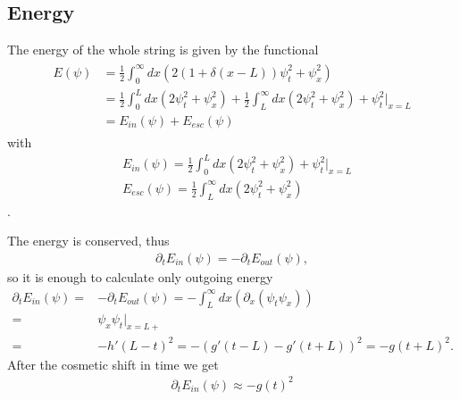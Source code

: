 \documentclass[
a4paper,%
10pt,%
titlepage,%
twoside%
]{article}
\begin{document}



\subsection{Energy}
The energy of the whole string is given by the functional
\begin{align}
  \begin{split}
    E(\psi)&=\frac{1}{2}\int_0^\infty dx (2(1+\delta(x-L))\psi_t^2+\psi_x^2)\\
    &=\frac{1}{2}\int_0^L dx(2\psi_t^2+\psi_x^2)+\frac{1}{2}\int_L^\infty dx(2\psi_t^2+\psi_x^2)+\psi_t^2\bigg|_{x=L}\\
    &=E_{in}(\psi)+E_{esc}(\psi)
  \end{split}
\end{align}
with
\begin{align}
  &E_{in}(\psi)=\frac{1}{2}\int_0^L dx(2\psi_t^2+\psi_x^2)+\psi_t^2\bigg|_{x=L}\\
  &E_{esc}(\psi)=\frac{1}{2}\int_L^\infty dx(2\psi_t^2+\psi_x^2)
\end{align}.

The energy is conserved, thus
\begin{align}
  \partial_t E_{in}(\psi)=-\partial_t E_{out}(\psi),
\end{align}
so it is enough to calculate only outgoing energy
\begin{align}\label{eq:enleak}
  \partial_t E_{in}(\psi)=&-\partial_t E_{out}(\psi)=-\int_L^\infty dx(\partial_x(\psi_t\psi_x))\\
  =&\psi_x\psi_t\big|_{x=L+}\\
  =&-h'(L-t)^2=-(g'(t-L)-g'(t+L))^2=-g(t+L)^2.
\end{align}
After the cosmetic shift in time we get
\begin{align}
  \partial_t E_{in}(\psi)\approx -g(t)^2
\end{align}
\end{document}
